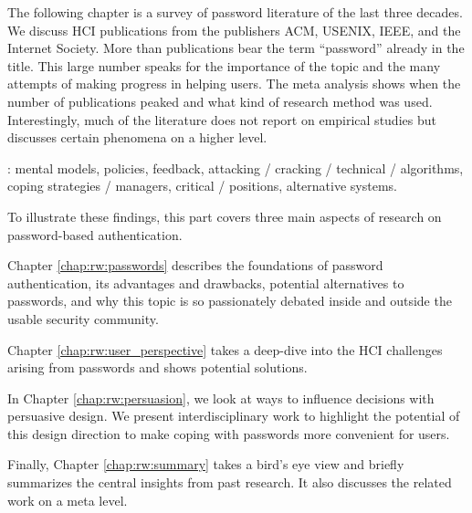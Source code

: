 \label{sec:rw:intro}


The following chapter is a survey of password literature of the last three decades. We discuss HCI publications from the publishers ACM, USENIX, IEEE, and the Internet Society. More than  publications bear the term ``password'' already in the title. This large number speaks for the importance of the topic and the many attempts of making progress in helping users. The meta analysis shows when the number of publications peaked and what kind of research method was used. Interestingly, much of the literature does not report on empirical studies but discusses certain phenomena on a higher level. 

: mental models, policies, feedback, attacking / cracking / technical / algorithms, coping strategies / managers, critical / positions, alternative systems.


To illustrate these findings, this part covers three main aspects of research on password-based authentication. 

Chapter \ref{chap:rw:passwords} describes the foundations of password authentication, its advantages and drawbacks, potential alternatives to passwords, and why this topic is so passionately debated inside and outside the usable security community. 

Chapter \ref{chap:rw:user_perspective} takes a deep-dive into the HCI challenges arising from passwords and shows potential solutions. 

In Chapter \ref{chap:rw:persuasion}, we look at ways to influence decisions with persuasive design. We present interdisciplinary work to highlight the potential of this design direction to make coping with passwords more convenient for users.  

Finally, Chapter \ref{chap:rw:summary} takes a bird's eye view and briefly summarizes the central insights from past research. It also discusses the related work on a meta level. 

